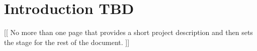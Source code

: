 \section{Introduction \textbf{TBD}}

[[ No more than one page that provides a short project description and then
sets the stage for the rest of the document. ]]



